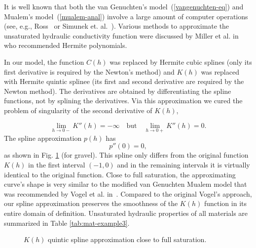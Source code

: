 \documentclass[final,3p,times,twocolumn]{elsarticle}
\begin{document}
It is well known that
both the van Genuchten's model~(\ref{vangenuchten-eq}) and Mualem's model~(\ref{mualem-anal})
involve a large amount of computer operations (see, e.g., Ross~\cite{ross} or 
Simunek et. al.~\cite{simunek}). Various methods to approximate the unsaturated hydraulic 
conductivity function were discussed by Miller et al. in \cite{miller} who recommended
Hermite polynomials.

In our model, the function $C(h)$ was replaced by Hermite cubic splines (only its first derivative 
is required by the Newton's method) and $K(h)$ was replaced with Hermite quintic splinee (its first 
and second derivative are required by the Newton method). The derivatives are obtained by differentiating 
the spline functions, not by splining the derivatives.
Via this approximation we cured the problem of singularity of the second 
derivative of $K(h)$, 

$$
  \lim_{h \to 0-} K''(h) = -\infty \quad \mbox{but} \quad \lim_{h \to 0+} K''(h) = 0. 
$$ 
The spline approximation $p(h)$ has 
$$
  p''(0) = 0,
$$
as shown in Fig. \ref{fig:kh-approx} (for gravel).
This spline only differs from the original function $K(h)$ in the first interval 
$(-1, 0)$ and in the remaining intervals it is virtually identical to the 
original function. Close to full saturation, the approximating curve's shape is 
very similar to the modified van Genuchten Mualem model that was recommended by Vogel et al. 
in~\cite{vogel}. Compared to the original Vogel's approach, our spline approximation 
preserves the smoothness of the $K(h)$ function in its entire domain of definition.
Unsaturated hydraulic properties of all materials are summarized in Table \ref{tab:mat-example3}.

\begin{figure}[htb!]
    \begin{center} 
    \end{center}
        \caption{$K(h)$ quintic spline approximation close to full saturation. }
      \label{fig:kh-approx}
\end{figure}
\end{document}
